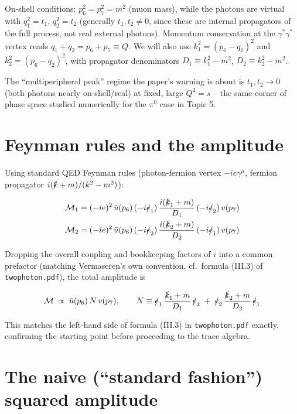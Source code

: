 \documentclass[11pt]{article}
\begin{document}
On-shell conditions: $p_6^2=p_7^2=m^2$ (muon mass), while the photons are
virtual with $q_1^2=t_1$, $q_2^2=t_2$ (generally $t_1,t_2\neq0$, since these
are internal propagators of the full process, not real external photons).
Momentum conservation at the $\gamma^*\gamma^*$ vertex reads
$q_1+q_2=p_6+p_7\equiv Q$. We will also use $k_1^2=(p_6-q_1)^2$ and
$k_2^2=(p_6-q_2)^2$, with propagator denominators
$D_1\equiv k_1^2-m^2$, $D_2\equiv k_2^2-m^2$.

The ``multiperipheral peak'' regime the paper's warning is about is
$t_1,t_2\to0$ (both photons nearly on-shell/real) at fixed, large $Q^2=s$
-- the same corner of phase space studied numerically for the $\pi^0$ case
in Topic 5.

\section{Feynman rules and the amplitude}
\label{sec:feynman-rules}

Using standard QED Feynman rules (photon-fermion vertex $-ie\gamma^\mu$,
fermion propagator $i(\slashed k+m)/(k^2-m^2)$):

\begin{align}
  \mathcal M_1 &= (-ie)^2\,\bar u(p_6)\,(-i\slashed e_1)\,
    \frac{i(\slashed k_1+m)}{D_1}\,(-i\slashed e_2)\,v(p_7)
    \label{eq:M1} \\
  \mathcal M_2 &= (-ie)^2\,\bar u(p_6)\,(-i\slashed e_2)\,
    \frac{i(\slashed k_2+m)}{D_2}\,(-i\slashed e_1)\,v(p_7)
    \label{eq:M2}
\end{align}

Dropping the overall coupling and bookkeeping factors of $i$ into a common
prefactor (matching Vermaseren's own convention, cf.\ formula (III.3) of
\texttt{twophoton.pdf}), the total amplitude is

\begin{equation}
  \mathcal M \;\propto\; \bar u(p_6)\,N\,v(p_7), \qquad
  N \equiv \slashed e_1\,\frac{\slashed k_1+m}{D_1}\,\slashed e_2
    \;+\; \slashed e_2\,\frac{\slashed k_2+m}{D_2}\,\slashed e_1
  \label{eq:N-def}
\end{equation}

This matches the left-hand side of formula (III.3) in \texttt{twophoton.pdf}
exactly, confirming the starting point before proceeding to the trace
algebra.

\section{The naive (``standard fashion'') squared amplitude}
\label{sec:naive}
\end{document}
